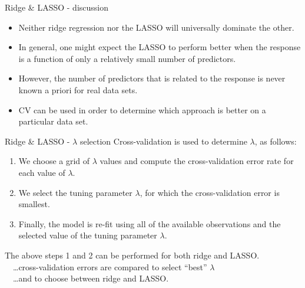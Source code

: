 \documentclass{beamer}
\begin{document}
\begin{frame}{Ridge \& LASSO - discussion}
\begin{itemize}
\item Neither ridge regression nor the LASSO will universally dominate the other.
\medskip
\item In general, one might expect the LASSO to perform better
when the response is a function of only a relatively small
number of predictors.
\medskip
\item However, the number of predictors that is related to the
response is never known a priori for real data sets.
\medskip
\item CV can be used in order to determine which approach is better on a particular data set.
\end{itemize}
\end{frame}
\begin{frame}{Ridge \& LASSO - $\lambda$ selection}
Cross-validation is used to determine $\lambda$, as follows:
\bigskip
\begin{enumerate}
\item We choose a grid of $\lambda$ values and compute the
cross-validation error rate for each value of $\lambda$.
\medskip
\item We select the tuning parameter $\lambda$, for which the
cross-validation error is smallest.
\medskip
\item Finally, the model is re-fit using all of the available
observations and the selected value of the tuning
parameter $\lambda$.
\end{enumerate}
\bigskip
The above steps 1 and 2 can be performed for both ridge and LASSO.\\
~~\dots cross-validation errors are compared to select ``best'' $\lambda$ \\
~~\dots and to choose between ridge and LASSO.

\end{frame}
\end{document}
